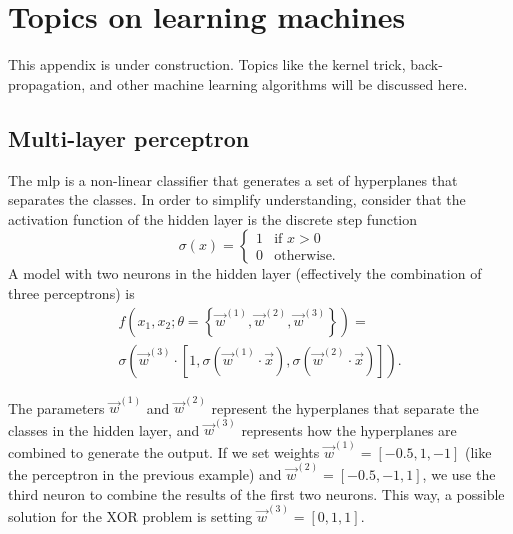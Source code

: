 \chapter{Topics on learning machines}
\label{chap:learning-machines}

This appendix is under construction.  Topics like the kernel trick, back-propagation, and
other machine learning algorithms will be discussed here.

{}
\clearpage

\section{Multi-layer perceptron}
\label{sec:mlp}

The \gls{mlp} is a non-linear classifier that generates a set of hyperplanes
that separates the classes.  In order to simplify understanding, consider
that the activation function of the hidden layer is the discrete step function
\begin{equation*}
  \sigma(x) = \begin{cases}
    1 & \text{if } x > 0 \\
    0 & \text{otherwise.}
  \end{cases}
\end{equation*}
A model with two neurons in the hidden layer (effectively the combination of three
perceptrons) is
\begin{multline*}
  f(x_1, x_2; \theta = \left\{ \vec{w}^{(1)}, \vec{w}^{(2)}, \vec{w}^{(3)} \right\}) = \\
  \sigma\left(
    \vec{w}^{(3)} \cdot \left[1, \sigma(\vec{w}^{(1)} \cdot \vec{x}), \sigma(\vec{w}^{(2)} \cdot \vec{x})\right]
  \right)\text{.}
\end{multline*}

The parameters $\vec{w}^{(1)}$ and $\vec{w}^{(2)}$ represent the hyperplanes that separate
the classes in the hidden layer, and $\vec{w}^{(3)}$ represents how the hyperplanes are
combined to generate the output.  If we set weights $\vec{w}^{(1)} = [-0.5, 1, -1]$ (like the
perceptron in the previous example) and $\vec{w}^{(2)} = [-0.5, -1, 1]$, we use the third neuron
to combine the results of the first two neurons.  This way, a possible solution for the
XOR problem is setting $\vec{w}^{(3)} = [0, 1, 1]$.

